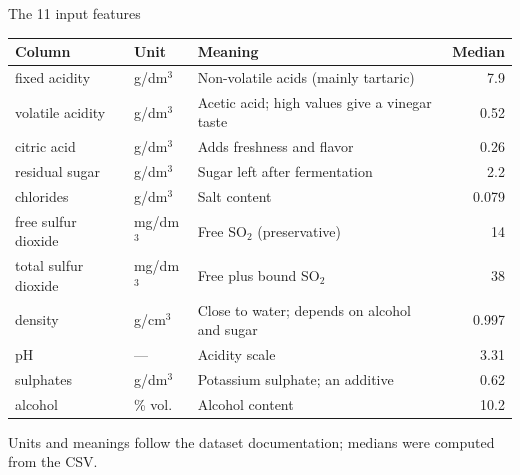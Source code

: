 \begin{frame}{The 11 input features}
\begingroup\footnotesize
\begin{tabularx}{\textwidth}{>{\ttfamily}l l X r}
\normalfont\bfseries Column & \bfseries Unit & \bfseries Meaning & \bfseries Median \\
\toprule
fixed acidity & g/dm$^3$ & Non-volatile acids (mainly tartaric) & 7.9 \\
volatile acidity & g/dm$^3$ & Acetic acid; high values give a vinegar taste & 0.52 \\
citric acid & g/dm$^3$ & Adds freshness and flavor & 0.26 \\
residual sugar & g/dm$^3$ & Sugar left after fermentation & 2.2 \\
chlorides & g/dm$^3$ & Salt content & 0.079 \\
free sulfur dioxide & mg/dm$^3$ & Free SO$_2$ (preservative) & 14 \\
total sulfur dioxide & mg/dm$^3$ & Free plus bound SO$_2$ & 38 \\
density & g/cm$^3$ & Close to water; depends on alcohol and sugar & 0.997 \\
pH & --- & Acidity scale & 3.31 \\
sulphates & g/dm$^3$ & Potassium sulphate; an additive & 0.62 \\
alcohol & \% vol. & Alcohol content & 10.2 \\
\bottomrule
\end{tabularx}
\par\endgroup
\vspace{0.3em}
{\scriptsize Units and meanings follow the dataset documentation; medians were computed from the CSV.\par}
\coursefooter
\end{frame}

